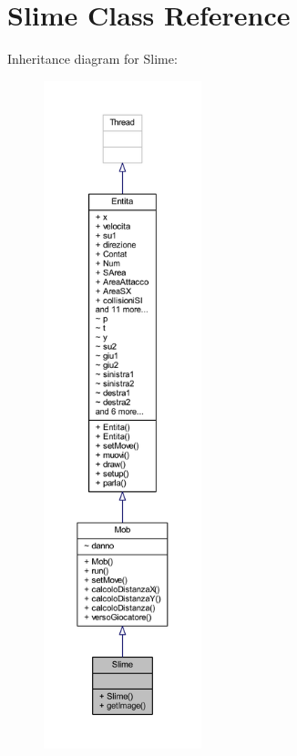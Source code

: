 \hypertarget{class_entita_1_1_slime}{}\section{Slime Class Reference}
\label{class_entita_1_1_slime}


Inheritance diagram for Slime\+:
\nopagebreak
\begin{figure}[H]
\begin{center}
\leavevmode
\includegraphics[height=550pt]{class_entita_1_1_slime__inherit__graph}
\end{center}
\end{figure}


